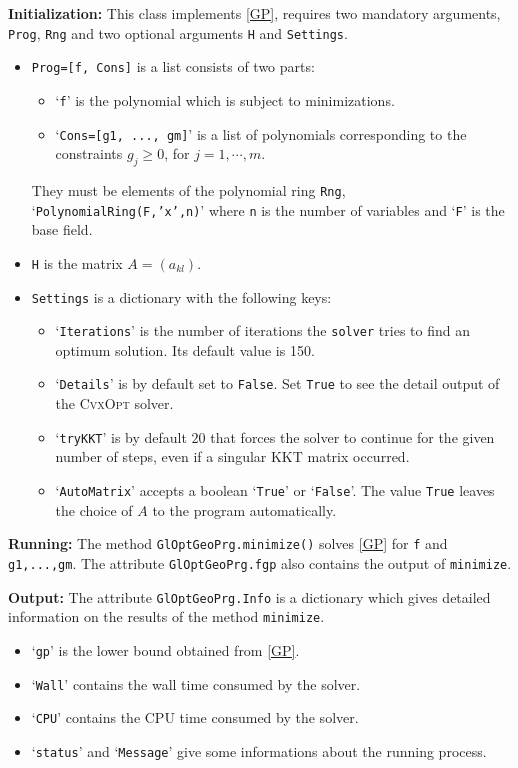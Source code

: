\documentclass{amsart}
\theoremstyle{definition}
\begin{document}
\noindent\textbf{Initialization:}
This class implements \eqref{GP}, requires two mandatory arguments, \texttt{Prog}, \texttt{Rng} and two optional arguments \texttt{H} and 
\texttt{Settings}.
\begin{itemize}
	\item{\texttt{Prog=[f, Cons]} is a list consists of two parts:
	\begin{itemize}
		\item{`\texttt{f}' is the polynomial which is subject to minimizations.}
		\item{`\texttt{Cons=[g1, ..., gm]}' is a list of polynomials corresponding to the constraints $g_j\ge0$, for $j=1,\cdots,m$.}
	\end{itemize}
	They must be elements of the polynomial ring \texttt{Rng}, `\texttt{PolynomialRing(F,'x',n)}' where \texttt{n} is 
	the number of variables and `\texttt{F}' is the base field.}
	\item{\texttt{H} is the matrix $A=(a_{kl})$.}
	\item{\texttt{Settings} is a dictionary with the following keys:
	\begin{itemize}
		\item{`\texttt{Iterations}' is the number of iterations the \texttt{solver} tries to find an optimum solution. Its default value is 150.}
		\item{`\texttt{Details}' is by default set to \texttt{False}. Set \texttt{True} to see the detail output of the \textsc{CvxOpt} solver.}
		\item{`\texttt{tryKKT}' is by default $20$ that forces the solver to continue for the given number of steps, even if a singular KKT matrix 
		occurred.}
		\item{`\texttt{AutoMatrix}' accepts a boolean `\texttt{True}' or `\texttt{False}'. The value \texttt{True} leaves the choice of $A$ to 
		the program automatically.}
	\end{itemize}
	}
\end{itemize}

\noindent\textbf{Running:}
The method \texttt{GlOptGeoPrg.minimize()} solves \eqref{GP} for \texttt{f} and \texttt{g1,...,gm}. 
The attribute \texttt{GlOptGeoPrg.fgp} also contains the output of \texttt{minimize}.

\noindent\textbf{Output:}
The attribute \texttt{GlOptGeoPrg.Info} is a dictionary which gives detailed information on the results of the method \texttt{minimize}.
\begin{itemize}
	\item{`\texttt{gp}' is the lower bound obtained from \eqref{GP}.}
	\item{`\texttt{Wall}' contains the wall time consumed by the solver.}
	\item{`\texttt{CPU}' contains the CPU time consumed by the solver.}
	\item{`\texttt{status}' and `\texttt{Message}' give some informations about the running process.}
\end{itemize}
\end{document}
